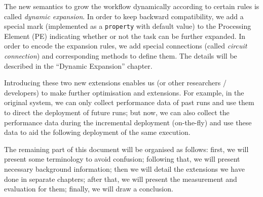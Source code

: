 The new semantics to grow the workflow dynamically according to certain rules is called \emph{dynamic expansion}. In order to keep backward compatibility, we add a special mark (implemented as a \lstinline|property| with default value) to the Processing Element (PE) indicating whether or not the task can be further expanded. In order to encode the expansion rules, we add special connections (called \emph{circuit connection}) and corresponding methods to define them. The details will be described in the ``Dynamic Expansion'' chapter.

Introducing these two new extensions enables us (or other researchers / developers) to make further optimisation and extensions. For example, in the original \dpy system, we can only collect performance data of past runs and use them to direct the deployment of future runs; but now, we can also collect the performance data during the incremental deployment (\ie on-the-fly) and use these data to aid the following deployment of the same execution.

The remaining part of this document will be organised as follows: first, we will present some terminology to avoid confusion; following that, we will present necessary background information; then we will detail the extensions we have done in separate chapters; after that, we will present the measurement and evaluation for them; finally, we will draw a conclusion.
